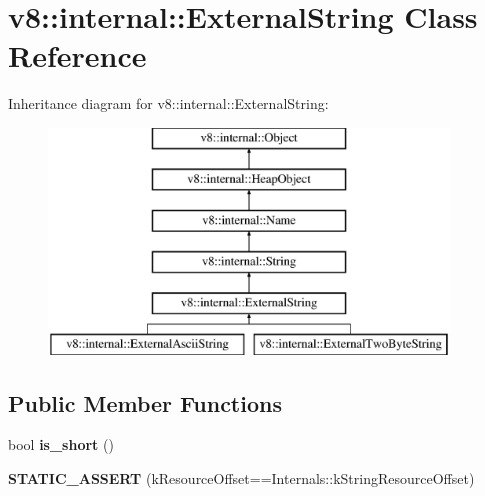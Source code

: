 \hypertarget{classv8_1_1internal_1_1_external_string}{}\section{v8\+:\+:internal\+:\+:External\+String Class Reference}
\label{classv8_1_1internal_1_1_external_string}
Inheritance diagram for v8\+:\+:internal\+:\+:External\+String\+:\begin{figure}[H]
\begin{center}
\leavevmode
\includegraphics[height=6.000000cm]{classv8_1_1internal_1_1_external_string}
\end{center}
\end{figure}
\subsection*{Public Member Functions}
\begin{DoxyCompactItemize}
\item 
\hypertarget{classv8_1_1internal_1_1_external_string_aa01265ee74be4036b44f3b86865ff222}{}bool {\bfseries is\+\_\+short} ()\label{classv8_1_1internal_1_1_external_string_aa01265ee74be4036b44f3b86865ff222}

\item 
\hypertarget{classv8_1_1internal_1_1_external_string_aedeea945a222ae1a66308dbfecb8d970}{}{\bfseries S\+T\+A\+T\+I\+C\+\_\+\+A\+S\+S\+E\+R\+T} (k\+Resource\+Offset==Internals\+::k\+String\+Resource\+Offset)\label{classv8_1_1internal_1_1_external_string_aedeea945a222ae1a66308dbfecb8d970}

\end{DoxyCompactItemize}
